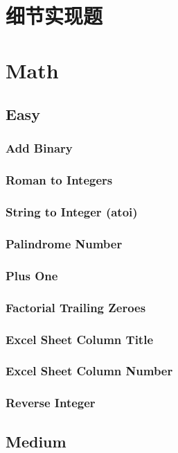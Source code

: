 \documentclass[11pt]{book}
\begin{document}
\chapter{细节实现题}
\label{sec-20}

\chapter{Math}
\label{sec-21}
\section{Easy}
\label{sec-21-1}
\subsection{Add Binary}
\label{sec-21-1-1}
\subsection{Roman to Integers}
\label{sec-21-1-2}
\subsection{String to Integer (atoi)}
\label{sec-21-1-3}
\subsection{Palindrome Number}
\label{sec-21-1-4}
\subsection{Plus One}
\label{sec-21-1-5}

\subsection{Factorial Trailing Zeroes}
\label{sec-21-1-6}
\subsection{Excel Sheet Column Title}
\label{sec-21-1-7}
\subsection{Excel Sheet Column Number}
\label{sec-21-1-8}
\subsection{Reverse Integer}
\label{sec-21-1-9}
\section{Medium}
\label{sec-21-2}
\end{document}
